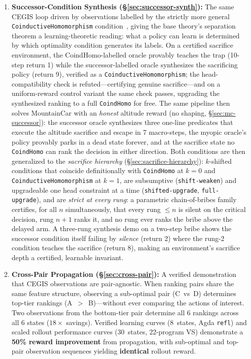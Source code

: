 \documentclass[9pt,a4paper]{article}
\theoremstyle{plain}
\theoremstyle{definition}
\theoremstyle{remark}
\begin{document}
\begin{enumerate}
\item \textbf{Successor-Condition Synthesis (\S\ref{sec:successor-synth}):} The same CEGIS loop driven by observations labelled by the strictly more general \texttt{CoinductiveHomomorphism} condition~\cite{CSHRLSuccessor}, giving the base theory's separation theorem a learning-theoretic reading: what a policy can learn is determined by which optimality condition generates its labels.  On a certified sacrifice environment, the CoindHomo-labelled oracle provably teaches the trap (10-step return 1) while the successor-labelled oracle synthesizes the sacrificing policy (return 9), verified as a \texttt{CoinductiveHomomorphism}; the head-compatibility check is refuted---certifying genuine sacrifice---and on a uniform-reward control variant the same check passes, upgrading the synthesized ranking to a full \texttt{CoindHomo} for free.  The same pipeline then solves MountainCar with an \emph{honest} altitude reward (no shaping, \S\ref{sec:mc-successor}): the successor oracle synthesizes three one-line predicates that execute the altitude sacrifice and escape in 7 macro-steps, the myopic oracle's policy provably parks in a dead state forever, and at the sacrifice state no \texttt{CoindHomo} can rank the decision in either direction.  Both conditions are then generalized to the \emph{sacrifice hierarchy} (\S\ref{sec:sacrifice-hierarchy}): $k$-shifted conditions that coincide definitionally with \texttt{CoindHomo} at $k=0$ and \texttt{CoinductiveHomomorphism} at $k=1$, are subsumptive (\texttt{shift-weaken}) and upgradeable one head constraint at a time (\texttt{shifted-upgrade}, \texttt{full-upgrade}), and are \emph{strict at every rung}: a parametric chain-of-bribes family certifies, for all $n$ simultaneously, that every rung $\le n$ is silent on the critical decision, rung $n{+}1$ ranks it, and no rung ever ranks the bribe above the delayed arm.  A three-rung synthesis demo on a two-step bribe shows the successor condition itself failing by \emph{silence} (return 2) where the rung-2 condition teaches the sacrifice (return 8), making an environment's sacrifice depth a certified, learnable invariant.

\item \textbf{Cross-Pair Propagation (\S\ref{sec:cross-pair}):} A verified demonstration that CEGIS observations are pair-agnostic.  When ranking pairs share the same feature structure, observing a sub-optimal pair (C~vs~D) determines top-tier rankings (A~$>$~B)---without ever comparing the actions of interest.  Two observations from the bottom-tier pair determine all 6 rankings across all 6 states ($18\times$ savings).  Verified learning curves (8~states, Agda \texttt{refl}) and scaled rollout performance curves (30~states, 22-program VS) demonstrate a \textbf{50\% reward improvement} from propagation, with sub-optimal and top-pair observation sequences yielding \textbf{identical} rollout reward.


\end{enumerate}
\end{document}
